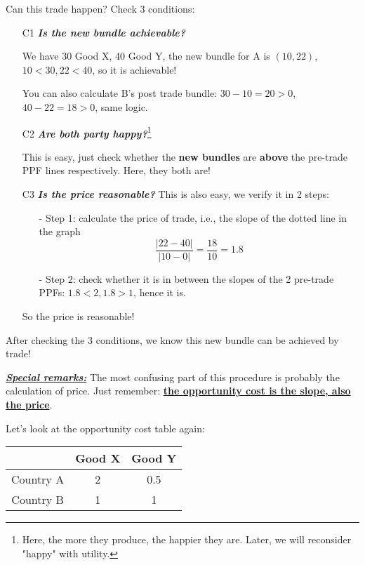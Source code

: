 \documentclass[twoside]{article}
\theoremstyle{definition}
\begin{document}
Can this trade happen? Check 3 conditions:
\begin{itemize}
    \item[C1] \textbf{\textit{Is the new bundle achievable?}}
    
    We have 30 Good X, 40 Good Y, the new bundle for A is $(10,22)$, $10<30,22<40$, so it is achievable! 
    
    You can also calculate B's post trade bundle: $30-10 = 20>0$, $40-22=18 >0$, same logic.
    
    \item[C2] \textbf{\textit{Are both party happy?}}\footnote{Here, the more they produce, the happier they are. Later, we will reconsider "happy" with utility.}
    
    This is easy, just check whether the \textbf{new bundles} are \textbf{above} the pre-trade PPF lines respectively. Here, they both are!
    
    \item[C3] \textbf{\textit{Is the price reasonable?}}
    This is also easy, we verify it in 2 steps:
    \begin{itemize}
        \item[-] Step 1: calculate the price of trade, i.e., the slope of the dotted line in the graph 
        $$
        \frac{\lvert 22-40 \rvert}{\lvert 10- 0 \rvert} = \frac{18}{10} = 1.8
        $$
        \item[-] Step 2: check whether it is in between the slopes of the 2 pre-trade PPFs: $1.8<2, 1.8>1$, hence it is.
    \end{itemize}
    So the price is reasonable!
\end{itemize}

After checking the 3 conditions, we know this new bundle can be achieved by trade!

\underline{\textbf{\textit{Special remarks:}}}
The most confusing part of this procedure is probably the calculation of price. Just remember: \textbf{\underline{the opportunity cost is the slope, also the price}}. 

Let's look at the opportunity cost table again:
    \begin{table}[h!]
    \centering
        \begin{tabular}{c|cc}
             & Good X & Good Y \\
            \hline
            Country A & 2 & 0.5 \\
            Country B & 1 & 1
        \end{tabular}
    \end{table}
    
\end{document}
